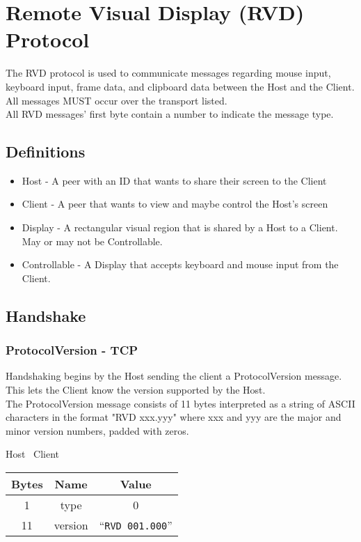 \section{Remote Visual Display (RVD) Protocol}

The RVD protocol is used to communicate messages regarding mouse input, keyboard input, frame data, and clipboard
data between the
Host and the Client.\\

All messages MUST occur over the transport listed.\\

All RVD messages' first byte contain a number to indicate the message type. \\

\subsection{Definitions}

\begin{itemize}
    \item Host - A peer with an ID that wants to share their screen to the Client
    \item Client - A peer that wants to view and maybe control the Host's screen
    \item Display - A rectangular visual region that is shared by a Host to a Client. May or may not be
    Controllable.
    \item Controllable - A Display that accepts keyboard and mouse input from the Client.
\end{itemize}

\subsection{Handshake}

\subsubsection{ProtocolVersion - TCP}
Handshaking begins by the Host sending the client a ProtocolVersion message. This lets the Client know the
version supported by the Host.\\

The ProtocolVersion message consists of 11 bytes interpreted as a string of ASCII characters in the format
"RVD xxx.yyy" where xxx and yyy are the major and minor version numbers, padded with zeros.

\begin{center}
    Host \textrightarrow\ Client\\
    \begin{tabular}{|c|c|c|}
        \hline
        \textbf{Bytes} & \textbf{Name} & \textbf{Value}           \\
        \hline
        1              & type          & 0                        \\
        \hline
        11             & version       & ``\texttt{RVD 001.000}'' \\
        \hline
    \end{tabular}
\end{center}

